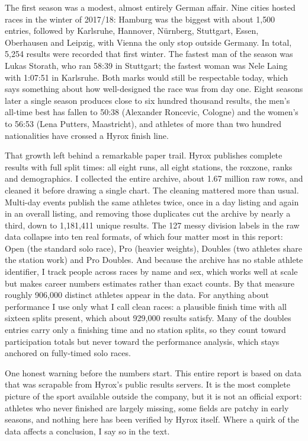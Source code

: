 \documentclass[11pt,a4paper]{article}
\begin{document}
The first season was a modest, almost entirely German affair. Nine cities
hosted races in the winter of 2017/18: Hamburg was the biggest with about
1{,}500 entries, followed by Karlsruhe, Hannover, N\"urnberg, Stuttgart,
Essen, Oberhausen and Leipzig, with Vienna the only stop outside Germany. In
total, 5{,}254 results were recorded that first winter. The fastest man of the
season was Lukas Storath, who ran 58:39 in Stuttgart; the fastest woman was
Nele Laing with 1:07:51 in Karlsruhe. Both marks would still be respectable
today, which says something about how well-designed the race was from day
one. Eight seasons later a single season produces close to six hundred
thousand results, the men's all-time best has fallen to 50:38 (Alexander
Roncevic, Cologne) and the women's to 56:53 (Lena Putters, Maastricht), and
athletes of more than two hundred nationalities have crossed a Hyrox finish
line.

That growth left behind a remarkable paper trail. Hyrox publishes complete
results with full split times: all eight runs, all eight stations, the
roxzone, ranks and demographics. I collected the entire archive, about 1.67
million raw rows, and cleaned it before drawing a single chart. The cleaning
mattered more than usual. Multi-day events publish the same athletes twice,
once in a day listing and again in an overall listing, and removing those
duplicates cut the archive by nearly a third, down to 1{,}181{,}411 unique
results. The 127 messy division labels in the raw data collapse into ten real
formats, of which four matter most in this report: Open (the standard solo
race), Pro (heavier weights), Doubles (two athletes share the station work)
and Pro Doubles. And because the archive has no stable athlete identifier, I
track people across races by name and sex, which works well at scale but
makes career numbers estimates rather than exact counts. By that measure
roughly 906{,}000 distinct athletes appear in the data. For anything about
performance I use only what I call clean races: a plausible finish time with
all sixteen splits present, which about 929{,}000 results satisfy. Many of
the doubles entries carry only a finishing time and no station splits, so
they count toward participation totals but never toward the performance
analysis, which stays anchored on fully-timed solo races.

One honest warning before the numbers start. This entire report is based on
data that was scrapable from Hyrox's public results servers. It is the most
complete picture of the sport available outside the company, but it is not an
official export: athletes who never finished are largely missing, some fields
are patchy in early seasons, and nothing here has been verified by Hyrox
itself. Where a quirk of the data affects a conclusion, I say so in the text.
\end{document}
